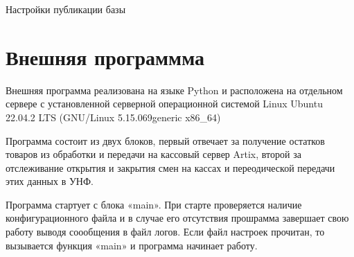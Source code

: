 \documentclass[a4paper,10pt,russian]{report}
\begin{document}
\sphinxAtStartPar
Настройки публикации базы

\begin{figure}[htbp]
\centering

\noindent{}
\end{figure}

\sphinxstepscope


\chapter{Внешняя программма}
\label{\detokenize{prox:id1}}\label{\detokenize{prox::doc}}
\sphinxAtStartPar
Внешняя программа реализована на языке Python и расположена на отдельном сервере с установленной серверной операционной системой Linux
Ubuntu 22.04.2 LTS (GNU/Linux 5.15.0\sphinxhyphen{}69\sphinxhyphen{}generic x86\_64)

\sphinxAtStartPar
Программа состоит из двух блоков, первый отвечает за получение остатков товаров из обработки и передачи на кассовый сервер Artix,
второй за отслеживание открытия и закрытия смен на кассах и переодической передачи этих данных в УНФ.

\sphinxAtStartPar
{}

\sphinxAtStartPar
{}

\sphinxAtStartPar
Программа стартует с блока «main». При старте проверяется наличие конфигурационного файла  и
в случае его отсутствия прошрамма завершает свою работу выводя соообщения в файл логов. Если
файл настроек прочитан, то вызывается функция «main» и программа начинает работу.

\begin{sphinxVerbatim}[commandchars=\\\{\}]
  
   
    
\end{sphinxVerbatim}
\end{document}
